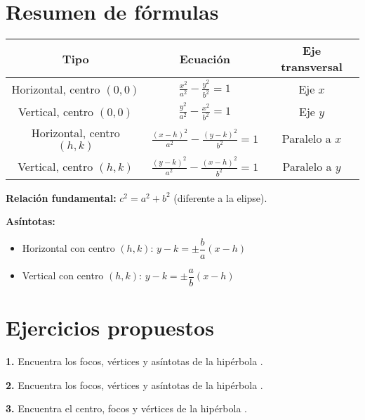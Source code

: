 \documentclass[12pt,a4paper]{article}
\begin{document}
	\section{Resumen de fórmulas}

	\begin{center}
		\begin{tabular}{|c|c|c|}
			\hline
			\textbf{Tipo} & \textbf{Ecuación} & \textbf{Eje transversal}\\
			\hline
			Horizontal, centro $(0,0)$ & $\displaystyle\frac{x^2}{a^2}-\frac{y^2}{b^2}=1$ & Eje $x$\\
			\hline
			Vertical, centro $(0,0)$ & $\displaystyle\frac{y^2}{a^2}-\frac{x^2}{b^2}=1$ & Eje $y$\\
			\hline
			Horizontal, centro $(h,k)$ & $\displaystyle\frac{(x-h)^2}{a^2}-\frac{(y-k)^2}{b^2}=1$ & Paralelo a $x$\\
			\hline
			Vertical, centro $(h,k)$ & $\displaystyle\frac{(y-k)^2}{a^2}-\frac{(x-h)^2}{b^2}=1$ & Paralelo a $y$\\
			\hline
		\end{tabular}
	\end{center}

	\bigskip

	\textbf{Relación fundamental:} $\boxed{c^2=a^2+b^2}$ (diferente a la elipse).

	\bigskip

	\textbf{Asíntotas:}
	\begin{itemize}
		\item Horizontal con centro $(h,k)$: $y-k=\pm\dfrac{b}{a}(x-h)$
		\item Vertical con centro $(h,k)$: $y-k=\pm\dfrac{a}{b}(x-h)$
	\end{itemize}

	\section{Ejercicios propuestos}

	\textbf{1.} Encuentra los focos, vértices y asíntotas de la hipérbola {}.

	\bigskip

	\textbf{2.} Encuentra los focos, vértices y asíntotas de la hipérbola {}.

	\bigskip

	\textbf{3.} Encuentra el centro, focos y vértices de la hipérbola {}.
\end{document}
